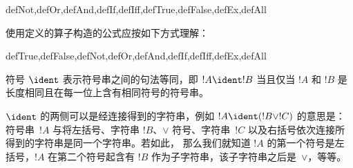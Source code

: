 \documentclass[../../../include/open-logic-section]{subfiles}
\begin{document}
\begin{tagblock}{defNot,defOr,defAnd,defIf,defIff,defTrue,defFalse,defEx,defAll}
\begin{defn}
使用定义的算子构造的公式应按如下方式理解：

\begin{tagenumerate}{defTrue,defFalse,defNot,defOr,defAnd,defIf,defIff,defEx,defAll}







\end{tagenumerate}
\end{defn}
\end{tagblock}

\begin{defn}[句法等同]
符号 $\ident$ 表示符号串之间的句法等同，即 $!A \ident !B$ 当且仅当 $!A$ 和 $!B$ 是长度相同且在每一位上含有相同符号的符号串。
\end{defn}

$\ident$ 的两侧可以是经连接得到的字符串，例如 $!A \ident (!B \lor !C)$ 的意思是：符号串~$!A$ 与将左括号、字符串 $!B$、$\lor$ 符号、字符串~$!C$ 以及右括号依次连接所得到的字符串是同一个字符串。若如此，
那么我们就知道 $!A$ 的第一个符号是左括号，$!A$ 在第二个符号起含有 $!B$ 作为子字符串，该子字符串之后是~$\lor$，等等。
\end{document}
